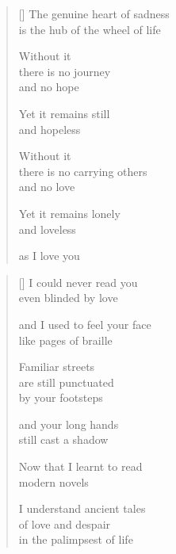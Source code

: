 \documentclass[12pt,a4paper]{article}
\begin{document}
\newpage

\poemtitle{}

\settowidth{\versewidth}{The genuine heart of sadness}

\bigskip

\begin{verse}[\versewidth]
The genuine heart of sadness \\
is the hub of the wheel of life

Without it \\
there is no journey \\
and no hope

Yet it remains still \\
and hopeless

Without it \\
there is no carrying others \\
and no love

Yet it remains lonely \\
and loveless

as I love you
\end{verse}


\newpage

\poemtitle{}

\settowidth{\versewidth}{and I used to feel your face}

\bigskip

\begin{verse}[\versewidth]
  I could never read you \\
  even blinded by love

  and I used to feel your face \\
  like pages of braille

  Familiar streets \\
  are still punctuated \\
  by your footsteps

  and your long hands \\
  still cast a shadow

  Now that I learnt to read \\
  modern novels

  I understand ancient tales \\
  of love and despair \\
  in the palimpsest of life
\end{verse}
\end{document}
